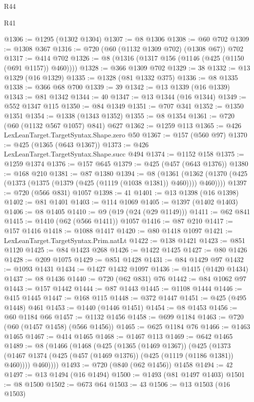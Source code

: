 \begin{lexlean}{R44}
\begin{lexlean}{R41}
\begin{coremodule}
{{{{{{{{{{{{{{{{{{{{{{{{{{{{{{{{{{{{{{{{{{{{{{{{{{{{{{{{{{{{{{{{{{{{{{{{{{{{{{{{{{{{{{{@1306 := @1295 (@1302 @1304)
@1307 := @8 @1306
@1308 := @60 @702
@1309 := @1308 @367
@1316 := @720 (@60 (@1132 @1309 @702) (@1308 @67)) @702
@1317 := @414 @702
@1326 := @8 (@1316 (@1317 @156 (@1146 (@425 (@1150 (@691 @1157)) @460))))
@1328 := @366 @1309 @702
@1329 := 38
@1332 := @13 @1329 (@16 @1329)
@1335 := @1328 (@81 @1332 @375)
@1336 := @8 @1335
@1338 := @366 @68 @700
@1339 := 39
@1342 := @13 @1339 (@16 @1339)
@1343 := @81 @1342
@1344 := 40
@1347 := @13 @1344 (@16 @1344)
@1349 := @552 @1347 @115
@1350 := @84 @1349
@1351 := @707 @341
@1352 := @1350 @1351
@1354 := @1338 (@1343 @1352)
@1355 := @8 @1354
@1361 := @720 (@60 (@1132 @567 @1057) @841) @627
@1362 := @1259 @113
@1365 := @426 LexLeanTarget.TargetSyntax.Shape.zero @50
@1367 := @157 (@560 @97)
@1370 := @425 (@1365 (@643 @1367))
@1373 := @426 LexLeanTarget.TargetSyntax.Shape.succ @494
@1374 := @1152 @158
@1375 := @1259 @1374
@1376 := @157 @645
@1379 := @425 (@457 (@643 @1376))
@1380 := @168 @210
@1381 := @87 @1380
@1394 := @8
    (@1361 (@1362 (@1370 (@425 (@1373 (@1375 (@1379 (@425 (@1119 (@1038 @1381)) @460)))) @460))))
@1397 := @720 (@566 @831) @1057
@1398 := 41
@1401 := @13 @1398 (@16 @1398)
@1402 := @81 @1401
@1403 := @114 @1069
@1405 := @1397 (@1402 @1403)
@1406 := @8 @1405
@1410 := @9 (@19 (@24 (@29 @1149)))
@1411 := @62 @841
@1415 := @1410 (@62 (@566 @1411)) @1057
@1416 := @87 @210
@1417 := @157 @1416
@1418 := @1088 @1417
@1420 := @80 @1418 @1097
@1421 := LexLeanTarget.TargetSyntax.Prim.natLt
@1422 := @138 @1421
@1423 := @851 @1120
@1425 := @84 @1423 @268
@1426 := @1422 @1425
@1427 := @80 @1426
@1428 := @209 @1075
@1429 := @851 @1428
@1431 := @84 @1429 @97
@1432 := @1093 @1431
@1434 := @1427 @1432 @1097
@1436 := @1415 (@1420 @1434)
@1437 := @8 @1436
@1440 := @720 (@62 @831) @76
@1442 := @84 @1062 @97
@1443 := @157 @1442
@1444 := @87 @1443
@1445 := @1108 @1444
@1446 := @415 @1445
@1447 := @168 @115
@1448 := @372 @1447
@1451 := @425 (@495 @1448) @461
@1453 := @1440 (@1446 @1451)
@1454 := @8 @1453
@1456 := @60 @1184 @66
@1457 := @1132 @1456
@1458 := @699 @1184
@1463 := @720 (@60 (@1457 @1458) (@566 @1456))
@1465 := @625 @1184 @76
@1466 := @1463 @1465
@1467 := @414 @1465
@1468 := @1467 @113
@1469 := @642 @1465
@1489 := @8
    (@1466
      (@1468
        (@425
          (@1365 (@1469 @1367))
          (@425
            (@1373 (@1467 @1374 (@425 (@457 (@1469 @1376)) (@425 (@1119 (@1186 @1381)) @460))))
            @460))))
@1493 := @720 (@840 (@62 @1456)) @1458
@1494 := 42
@1497 := @13 @1494 (@16 @1494)
@1500 := @1493 (@81 @1497 @1403)
@1501 := @8 @1500
@1502 := @673 @64
@1503 := 43
@1506 := @13 @1503 (@16 @1503)
}}}}}}}}}}}}}}}}}}}}}}}}}}}}}}}}}}}}}}}}}}}}}}}}}}}}}}}}}}}}}}}}}}}}}}}}}}}}}}}}}}}}}}}
\end{coremodule}
\end{lexlean}
\end{lexlean}
